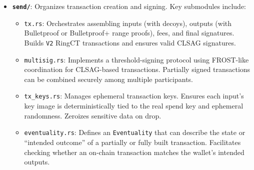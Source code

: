 \documentclass[12pt,a4paper]{article}
\begin{document}
\begin{itemize}
    \item \textbf{\texttt{send/}}: Organizes transaction creation and signing.
    Key submodules include:
    \begin{itemize}
        \item \texttt{tx.rs}: Orchestrates assembling inputs (with decoys),
        outputs (with Bulletproof or Bulletproof+ range proofs), fees, and final
        signatures. Builds \texttt{V2} RingCT transactions and ensures valid
        CLSAG signatures.
        \item \texttt{multisig.rs}: Implements a threshold-signing protocol
        using FROST-like coordination for CLSAG-based transactions. Partially
        signed transactions can be combined securely among multiple participants.
        \item \texttt{tx\_keys.rs}: Manages ephemeral transaction keys. Ensures
        each input’s key image is deterministically tied to the real spend key
        and ephemeral randomness. Zeroizes sensitive data on drop.
        \item \texttt{eventuality.rs}: Defines an \texttt{Eventuality} that can
        describe the state or “intended outcome” of a partially or fully built
        transaction. Facilitates checking whether an on-chain transaction
        matches the wallet’s intended outputs.
    \end{itemize}
\end{itemize}
\end{document}
